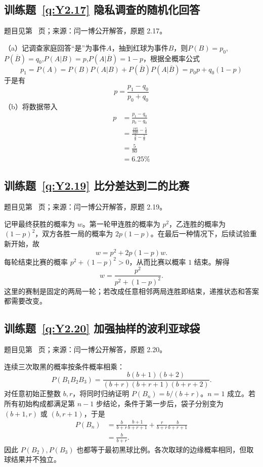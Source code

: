 \subsection*{训练题~\ref{q:Y2.17} 隐私调查的随机化回答}\label{a:Y2.17}{\small 题目见第~\pageref{q:Y2.17} 页；来源：闫一博公开解答，原题 2.17。}
\begin{solve}
（a）记调查家庭回答“是”为事件$A$，抽到红球为事件$B$，则$P(B)=p_0$,$P(\overline{B})=q_0$,$P(A|B)=p$,$P(A|\overline{B})=1-p$，根据全概率公式
\[{p_1} = P(A) = P(B)P(A|B) + P(\overline B )P(A|\overline B ) = {p_0}p + {q_0}(1 - p)\]
于是有
\[p = \frac{{{p_1} - {q_0}}}{{{p_0} + {q_0}}}\]
（b）将数据带入
\[\begin{aligned}p &= \frac{{{p_1} - {q_0}}}{{{p_0} - {q_0}}} \\&= \frac{{\frac{{195}}{{320}} - \frac{5}{8}}}{{\frac{3}{8} - \frac{5}{8}}} \\&= \frac{5}{{80}} \\&= 6.25\% \end{aligned}\]
\end{solve}

\subsection*{训练题~\ref{q:Y2.19} 比分差达到二的比赛}\label{a:Y2.19}{\small 题目见第~\pageref{q:Y2.19} 页；来源：闫一博公开解答，原题 2.19。}
\begin{solve}记甲最终获胜的概率为 $w$。第一轮甲连胜的概率为 $p^2$，乙连胜的概率为 $(1-p)^2$，双方各胜一局的概率为 $2p(1-p)$。在最后一种情况下，后续试验重新开始，故\[w=p^2+2p(1-p)w.\]每轮结束比赛的概率 $p^2+(1-p)^2>0$，从而比赛以概率 $1$ 结束。解得\[w=\frac{p^2}{p^2+(1-p)^2}.\]这里的赛制是固定的两局一轮；若改成任意相邻两局连胜即结束，递推状态和答案都需要改变。\end{solve}

\subsection*{训练题~\ref{q:Y2.20} 加强抽样的波利亚球袋}\label{a:Y2.20}{\small 题目见第~\pageref{q:Y2.20} 页；来源：闫一博公开解答，原题 2.20。}
\begin{solve}连续三次取黑的概率按条件概率相乘：\[P(B_1B_2B_3)=\frac{b(b+1)(b+2)}{(b+r)(b+r+1)(b+r+2)}.\]对任意初始正整数 $b,r$，将同时归纳证明 $P(B_n)=b/(b+r)$。$n=1$ 成立。若所有初始构成都满足第 $n-1$ 步结论，条件于第一步后，袋子分别变为 $(b+1,r)$ 或 $(b,r+1)$，于是\[\begin{aligned}P(B_n)&=\frac{b}{b+r}\frac{b+1}{b+r+1}+\frac{r}{b+r}\frac{b}{b+r+1}\\&=\frac{b}{b+r}.\end{aligned}\]因此 $P(B_2),P(B_3)$ 也都等于最初黑球比例。各次取球的边缘概率相同，但取球结果并不独立。\end{solve}

